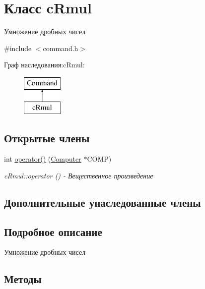 \hypertarget{classc_rmul}{}\section{Класс c\+Rmul}
\label{classc_rmul}


Умножение дробных чисел  




{\ttfamily \#include $<$command.\+h$>$}

Граф наследования\+:c\+Rmul\+:\begin{figure}[H]
\begin{center}
\leavevmode
\includegraphics[height=2.000000cm]{classc_rmul}
\end{center}
\end{figure}
\subsection*{Открытые члены}
\begin{DoxyCompactItemize}
\item 
int \hyperlink{classc_rmul_a59cc32a7f9833fd05fe1c8f9e60f48b3}{operator()} (\hyperlink{class_computer}{Computer} $\ast$C\+O\+MP)
\begin{DoxyCompactList}\small\item\em c\+Rmul\+::operator () -\/ Вещественное произведение \end{DoxyCompactList}\end{DoxyCompactItemize}
\subsection*{Дополнительные унаследованные члены}


\subsection{Подробное описание}
Умножение дробных чисел 

\subsection{Методы}
\hypertarget{classc_rmul_a59cc32a7f9833fd05fe1c8f9e60f48b3}{}\label{classc_rmul_a59cc32a7f9833fd05fe1c8f9e60f48b3} 

